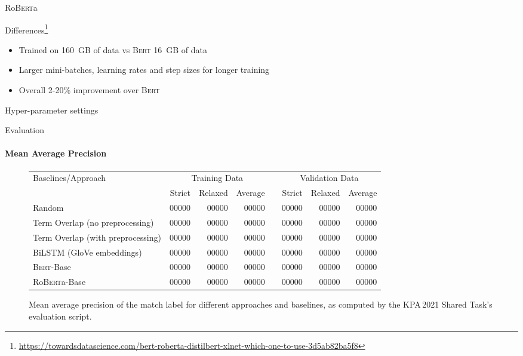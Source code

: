 \documentclass[english,handout]{mlutalk}
\newcommand{\Bert}{\textsc{Bert}\xspace}
\newcommand{\BertBase}{\Bert-Base\xspace}
\newcommand{\Roberta}{\mbox{Ro\textsc{Bert}a}\xspace}
\newcommand{\RobertaBase}{\Roberta-Base\xspace}
\begin{document}
\begin{frame}{\Roberta}
  \begin{block}{Differences\footnote{\scriptsize\url{https://towardsdatascience.com/bert-roberta-distilbert-xlnet-which-one-to-use-3d5ab82ba5f8}}}
    \begin{itemize}
      \item Trained on 160~GB of data vs \Bert 16~GB of data
      \item Larger mini-batches, learning rates and step sizes for longer training
      \item Overall 2-20\% improvement over \Bert
    \end{itemize}
  \end{block}

  \begin{block}{Hyper-parameter settings}
    
  \end{block}
\end{frame}

\begin{frame}{Evaluation}
  \framesubtitle{Mean Average Precision}
  \begin{figure}
    \centering
    \caption{Mean average precision of the match label for different approaches and baselines, as computed by the KPA\,2021 Shared Task's evaluation script.}
    \tiny
    \begin{tabular}{lrrrlrrr}
      \toprule
      Baselines/Approach & \multicolumn{3}{c}{Training Data} & & \multicolumn{3}{c}{Validation Data}\\ \cmidrule{2-4} \cmidrule{6-8}
        & Strict & Relaxed & Average & & Strict & Relaxed & Average\\
      \midrule
      Random 
      & 00000 & 00000 & 00000 & & 00000 & 00000 & 00000 \\
      Term Overlap (no preprocessing)
      & 00000 & 00000 & 00000 & & 00000 & 00000 & 00000 \\
      Term Overlap (with preprocessing)
      & 00000 & 00000 & 00000 & & 00000 & 00000 & 00000 \\
      \midrule
      BiLSTM (GloVe embeddings)
      & 00000 & 00000 & 00000 & & 00000 & 00000 & 00000 \\
      \BertBase
      & 00000 & 00000 & 00000 & & 00000 & 00000 & 00000 \\
      \RobertaBase
      & 00000 & 00000 & 00000 & & 00000 & 00000 & 00000 \\
      \bottomrule
    \end{tabular}
  \end{figure}
\end{frame}
\end{document}
